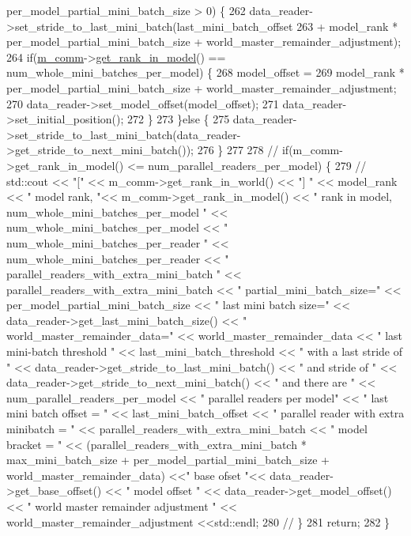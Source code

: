 \begin{DoxyCode}
      per\_model\_partial\_mini\_batch\_size > 0) \{
262     data\_reader->set\_stride\_to\_last\_mini\_batch(last\_mini\_batch\_offset
263                                             + model\_rank * per\_model\_partial\_mini\_batch\_size + 
      world\_master\_remainder\_adjustment); 
264     \textcolor{keywordflow}{if}(\hyperlink{classlbann_1_1generic__io__buffer_a2e4a46c85c8b30e10b1cc5acaa2c4cca}{m\_comm}->\hyperlink{classlbann_1_1lbann__comm_a789453454468a3b70de768537c50ca52}{get\_rank\_in\_model}() == num\_whole\_mini\_batches\_per\_model) \{
268       model\_offset =
269         model\_rank * per\_model\_partial\_mini\_batch\_size + world\_master\_remainder\_adjustment;
270       data\_reader->set\_model\_offset(model\_offset);
271       data\_reader->set\_initial\_position();
272     \}
273   \}\textcolor{keywordflow}{else} \{
275     data\_reader->set\_stride\_to\_last\_mini\_batch(data\_reader->get\_stride\_to\_next\_mini\_batch());
276   \}
277 
278   \textcolor{comment}{// if(m\_comm->get\_rank\_in\_model() <= num\_parallel\_readers\_per\_model) \{}
279   \textcolor{comment}{//   std::cout << "[" << m\_comm->get\_rank\_in\_world() << "] " << model\_rank << " model rank, "<<
       m\_comm->get\_rank\_in\_model() << " rank in model, num\_whole\_mini\_batches\_per\_model " <<
       num\_whole\_mini\_batches\_per\_model << " num\_whole\_mini\_batches\_per\_reader " << num\_whole\_mini\_batches\_per\_reader << "
       parallel\_readers\_with\_extra\_mini\_batch " << parallel\_readers\_with\_extra\_mini\_batch << " partial\_mini\_batch\_size=" <<
       per\_model\_partial\_mini\_batch\_size << " last mini batch size=" << data\_reader->get\_last\_mini\_batch\_size() << "
       world\_master\_remainder\_data=" << world\_master\_remainder\_data << " last mini-batch threshold " <<
       last\_mini\_batch\_threshold << " with a last stride of " << data\_reader->get\_stride\_to\_last\_mini\_batch() << " and stride of " <<
       data\_reader->get\_stride\_to\_next\_mini\_batch() << " and there are " << num\_parallel\_readers\_per\_model << "
       parallel readers per model" << " last mini batch offset = " << last\_mini\_batch\_offset <<  " parallel reader with
       extra minibatch = " << parallel\_readers\_with\_extra\_mini\_batch << " model bracket = " <<
       (parallel\_readers\_with\_extra\_mini\_batch * max\_mini\_batch\_size + per\_model\_partial\_mini\_batch\_size + world\_master\_remainder\_data)
       <<" base ofset "<< data\_reader->get\_base\_offset() << " model offset " << data\_reader->get\_model\_offset() << "
       world master remainder adjustment " << world\_master\_remainder\_adjustment <<std::endl;}
280   \textcolor{comment}{// \}}
281   \textcolor{keywordflow}{return};
282 \}
\end{DoxyCode}

